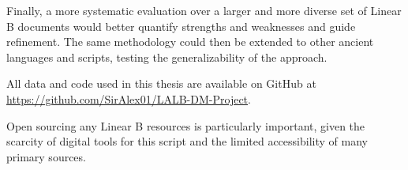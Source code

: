 Finally, a more systematic evaluation over a larger and more diverse set of Linear B documents would better quantify strengths and weaknesses and guide refinement.
The same methodology could then be extended to other ancient languages and scripts, testing the generalizability of the approach.

All data and code used in this thesis are available on GitHub at \url{https://github.com/SirAlex01/LALB-DM-Project}.

Open sourcing any Linear B resources is particularly important, given the scarcity of digital tools for this script and the limited accessibility of many primary sources.
